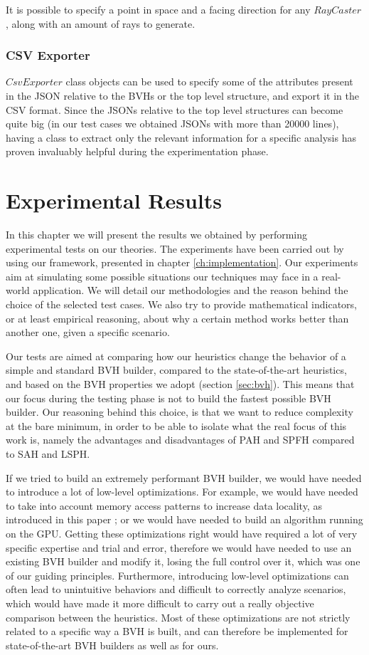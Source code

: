 \documentclass{PoliMi_MasterThesis}
\begin{document}
It is possible to specify a point in space and a facing direction for any $RayCaster$, along with an amount of rays to generate.

\subsection{CSV Exporter}
$CsvExporter$ class objects can be used to specify some of the attributes present in the JSON relative to the BVHs or the top level structure, and export it in the CSV format. Since the JSONs relative to the top level structures can become quite big (in our test cases we obtained JSONs with more than 20000 lines), having a class to extract only the relevant information for a specific analysis has proven invaluably helpful during the experimentation phase.

\chapter{Experimental Results} \label{ch:experimental_results}
In this chapter we will present the results we obtained by performing experimental tests on our theories. The experiments have been carried out by using our framework, presented in chapter \ref{ch:implementation}. Our experiments aim at simulating some possible situations our techniques may face in a real-world application. We will detail our methodologies and the reason behind the choice of the selected test cases. We also try to provide mathematical indicators, or at least empirical reasoning, about why a certain method works better than another one, given a specific scenario.

Our tests are aimed at comparing how our heuristics change the behavior of a simple and standard BVH builder, compared to the state-of-the-art heuristics, and based on the BVH properties we adopt (section \ref{sec:bvh}). This means that our focus during the testing phase is not to build the fastest possible BVH builder. Our reasoning behind this choice, is that we want to reduce complexity at the bare minimum, in order to be able to isolate what the real focus of this work is, namely the advantages and disadvantages of PAH and SPFH compared to SAH and LSPH.

If we tried to build an extremely performant BVH builder, we would have needed to introduce a lot of low-level optimizations. For example, we would have needed to take into account memory access patterns to increase data locality, as introduced in this paper \cite{cache_efficient_bvhs}; or we would have needed to build an algorithm running on the GPU. Getting these optimizations right would have required a lot of very specific expertise and trial and error, therefore we would have needed to use an existing BVH builder and modify it, losing the full control over it, which was one of our guiding principles. Furthermore, introducing low-level optimizations can often lead to unintuitive behaviors and difficult to correctly analyze scenarios, which would have made it more difficult to carry out a really objective comparison between the heuristics. Most of these optimizations are not strictly related to a specific way a BVH is built, and can therefore be implemented for state-of-the-art BVH builders as well as for ours.
\end{document}
